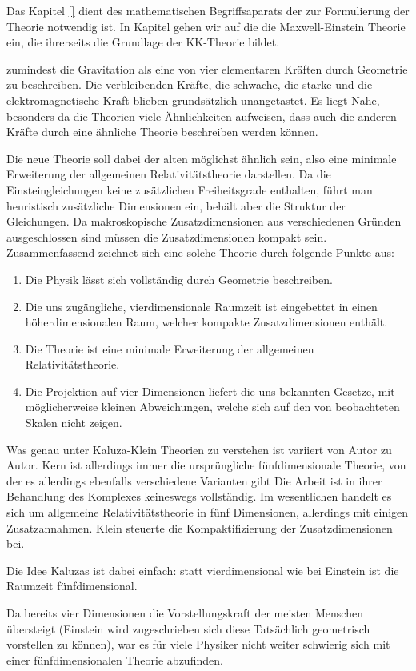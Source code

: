 Das Kapitel \autoref{} dient des mathematischen Begriffsaparats der zur
Formulierung der Theorie notwendig ist. In Kapitel gehen wir auf die die
Maxwell-Einstein Theorie ein, die ihrerseits die Grundlage der KK-Theorie
bildet.

zumindest die Gravitation als eine von vier elementaren Kräften durch Geometrie
zu beschreiben. Die verbleibenden Kräfte, die schwache, die starke und die elektromagnetische Kraft
blieben grundsätzlich unangetastet. Es liegt Nahe, besonders da die Theorien
viele Ähnlichkeiten aufweisen, dass auch die anderen Kräfte durch eine ähnliche
Theorie beschreiben werden können.

Die neue Theorie soll dabei der alten 
möglichst ähnlich sein, also eine minimale Erweiterung der allgemeinen
Relativitätstheorie darstellen.
Da die Einsteingleichungen keine
zusätzlichen Freiheitsgrade enthalten, führt man heuristisch zusätzliche
Dimensionen ein, behält aber die Struktur der Gleichungen.
Da makroskopische Zusatzdimensionen aus verschiedenen Gründen ausgeschlossen
sind müssen die Zusatzdimensionen kompakt sein.
Zusammenfassend zeichnet sich eine solche Theorie durch folgende Punkte aus:
\begin{enumerate} 
\item Die Physik lässt sich vollständig durch Geometrie beschreiben.
\item Die uns zugängliche, vierdimensionale Raumzeit ist eingebettet in einen
höherdimensionalen Raum, welcher kompakte Zusatzdimensionen enthält.
\item Die Theorie ist eine minimale Erweiterung der allgemeinen
Relativitätstheorie.
\item Die Projektion auf vier Dimensionen liefert die uns bekannten Gesetze, mit
möglicherweise kleinen Abweichungen, welche sich auf den von beobachteten Skalen
nicht zeigen.
\end{enumerate}
Was genau unter Kaluza-Klein Theorien zu verstehen ist variiert von Autor zu
Autor. Kern ist allerdings immer die ursprüngliche fünfdimensionale Theorie,
von der es allerdings ebenfalls verschiedene Varianten gibt
Die Arbeit ist in ihrer Behandlung des Komplexes keineswegs vollständig. Im
wesentlichen handelt es sich um allgemeine Relativitätstheorie in fünf
Dimensionen, allerdings mit einigen Zusatzannahmen.
Klein steuerte die Kompaktifizierung der Zusatzdimensionen bei.

Die Idee Kaluzas ist dabei einfach: statt vierdimensional wie bei Einstein ist
die Raumzeit fünfdimensional. 

Da bereits vier Dimensionen die Vorstellungskraft der meisten Menschen
übersteigt (Einstein wird zugeschrieben sich diese Tatsächlich geometrisch
vorstellen zu können), war es für viele Physiker nicht weiter schwierig sich mit 
einer fünfdimensionalen Theorie abzufinden. 
